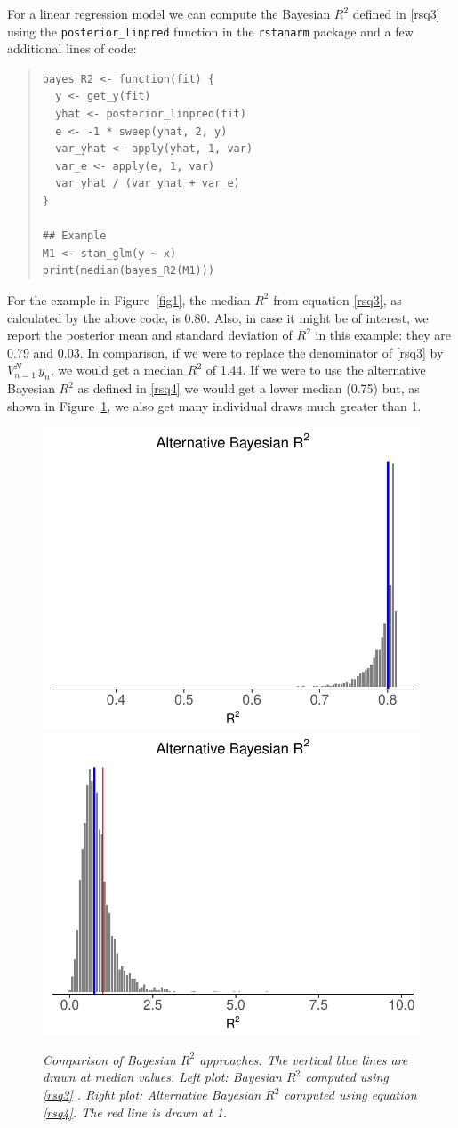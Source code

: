 \documentclass[11pt]{article}
\begin{document}
For a linear regression model we can compute the Bayesian $R^2$ defined in
\eqref{rsq3} using the \verb#posterior_linpred# function in the {\tt rstanarm}
package and a few additional lines of code:
%
\vspace{-\baselineskip}
\begin{quotation}
\noindent
\begin{small}
\begin{verbatim}
bayes_R2 <- function(fit) {
  y <- get_y(fit)
  yhat <- posterior_linpred(fit)
  e <- -1 * sweep(yhat, 2, y)
  var_yhat <- apply(yhat, 1, var)
  var_e <- apply(e, 1, var)
  var_yhat / (var_yhat + var_e)
}

## Example
M1 <- stan_glm(y ~ x)
print(median(bayes_R2(M1)))
\end{verbatim}
\end{small}
\end{quotation}
%
For the example in Figure~\ref{fig1}, the median $R^2$ from
equation \eqref{rsq3}, as calculated by the above code, is 0.80.  
Also, in case it might be of interest, we report the posterior mean and 
standard deviation of $R^2$ in this example: they are 0.79 and 0.03.
In comparison, if we were to replace the denominator of 
\eqref{rsq3} by $V_{n=1}^N \,y_n$, we would get a median $R^2$ of 1.44. 
If we were to use the alternative Bayesian $R^2$ as defined in \eqref{rsq4}
we would get a lower median (0.75) but, as shown in Figure~\ref{fig2}, 
we also get many individual draws much greater than 1.

\begin{figure}
\centerline{\includegraphics[width=.5\textwidth]{fig/rsquared2a-gg.pdf}\includegraphics[width=.5\textwidth]{fig/rsquared2b-gg.pdf}}
\vspace{-.1in}
\caption{\em 
Comparison of Bayesian $R^2$ approaches. The vertical blue lines are drawn at median values. 
{\em Left plot:} Bayesian $R^2$ computed using \eqref{rsq3} . 
{\em Right plot:}  Alternative Bayesian $R^2$ computed using equation \eqref{rsq4}. 
The red line is drawn at 1.
}
\label{fig2}
\end{figure}
\end{document}
